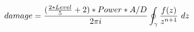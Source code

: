 \documentclass[preview]{standalone}
\begin{document}
\begin{align*}
\special{dvisvgm:raw <g id='unique000'>}damage = \frac{(\frac{2 * Level}{5} + 2) * Power * A/D}{2\pi i}\oint_{\gamma} \frac{f(z)}{z^{n+1}}~dz\special{dvisvgm:raw </g>}
\end{align*}
\end{document}
